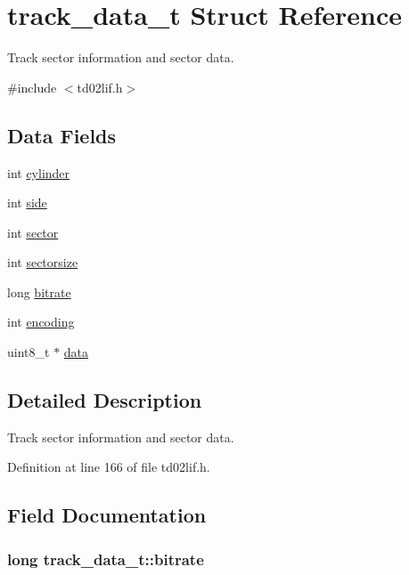 \hypertarget{structtrack__data__t}{}\section{track\+\_\+data\+\_\+t Struct Reference}
\label{structtrack__data__t}


Track sector information and sector data.  




{\ttfamily \#include $<$td02lif.\+h$>$}

\subsection*{Data Fields}
\begin{DoxyCompactItemize}
\item 
int \hyperlink{structtrack__data__t_a6639e83e4f30ca47f8501dfc570af1f0}{cylinder}
\item 
int \hyperlink{structtrack__data__t_a811847944e1571164ea32b48a07b0c3e}{side}
\item 
int \hyperlink{structtrack__data__t_ae6674e039871b8f8761a72b65b841980}{sector}
\item 
int \hyperlink{structtrack__data__t_a47c9f9fe17b64f31783970ef839f176c}{sectorsize}
\item 
long \hyperlink{structtrack__data__t_a21f9781ec400a28263ee9e3dd189215e}{bitrate}
\item 
int \hyperlink{structtrack__data__t_ab81a3c49248eaaf3f92d43d1ebd8a329}{encoding}
\item 
uint8\+\_\+t $\ast$ \hyperlink{structtrack__data__t_a77837d0b564b8ee8e05b7be88753fd15}{data}
\end{DoxyCompactItemize}


\subsection{Detailed Description}
Track sector information and sector data. 

Definition at line 166 of file td02lif.\+h.



\subsection{Field Documentation}
\subsubsection[{\texorpdfstring{bitrate}{bitrate}}]{\setlength{\rightskip}{0pt plus 5cm}long track\+\_\+data\+\_\+t\+::bitrate}\hypertarget{structtrack__data__t_a21f9781ec400a28263ee9e3dd189215e}{}\label{structtrack__data__t_a21f9781ec400a28263ee9e3dd189215e}


